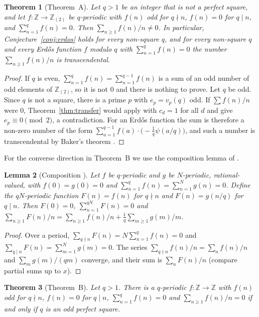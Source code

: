 \documentclass[11pt]{amsart}
\newtheorem{theorem}{Theorem}[section]
\newtheorem{lemma}[theorem]{Lemma}
\theoremstyle{definition}
\theoremstyle{remark}
\providecommand{\Z}{\mathbb Z}
\newcommand{\Zt}{\mathbb Z_{(2)}}
\numberwithin{equation}{section}
\begin{document}
\begin{theorem}[Theorem~A]\label{thm:main}
Let $q>1$ be an integer that is not a perfect square, and let $f\colon\Z\to\Zt$ be $q$-periodic with $f(n)$ odd for $q\nmid n$, $f(n)=0$ for $q\mid n$, and $\sum_{n=1}^qf(n)=0$.
Then $\sum_{n\ge1}f(n)/n\neq0$.
In particular, Conjecture~\ref{conj:erdos} holds for every non-square $q$, and for every non-square $q$ and every Erd\H{o}s function $f$ modulo $q$ with $\sum_{n=1}^qf(n)=0$ the number $\sum_{n\ge1}f(n)/n$ is transcendental.
\end{theorem}

\begin{proof}
If $q$ is even, $\sum_{n=1}^{q}f(n)=\sum_{n=1}^{q-1}f(n)$ is a sum of an odd number of odd elements of $\Zt$, so it is not $0$ and there is nothing to prove.
Let $q$ be odd.
Since $q$ is not a square, there is a prime $p$ with $e_p=v_p(q)$ odd.
If $\sum f(n)/n$ were $0$, Theorem~\ref{thm:transfer} would apply with $c_d=1$ for all $d$ and give $e_p\equiv0\pmod 2$, a contradiction.
For an Erd\H{o}s function the sum is therefore a non-zero number of the form $\sum_{a=1}^{q-1}f(a)\cdot\bigl(-\tfrac1q\psi(a/q)\bigr)$, and such a number is transcendental by Baker's theorem \cite{BBW73,MS07}.
\end{proof}

For the converse direction in Theorem~B we use the composition lemma of \cite{Kei26}.

\begin{lemma}[Composition {\cite[Lemma~3.5]{Kei26}}]\label{lem:compose}
Let $f$ be $q$-periodic and $g$ be $N$-periodic, rational-valued, with $f(0)=g(0)=0$ and $\sum_{n=1}^qf(n)=\sum_{n=1}^Ng(n)=0$.
Define the $qN$-periodic function $F(n)=f(n)$ for $q\nmid n$ and $F(n)=g(n/q)$ for $q\mid n$.
Then $F(0)=0$, $\sum_{n=1}^{qN}F(n)=0$ and $\sum_{n\ge1}F(n)/n=\sum_{n\ge1}f(n)/n+\frac1q\sum_{m\ge1}g(m)/m$.
\end{lemma}

\begin{proof}
Over a period, $\sum_{q\nmid n}F(n)=N\sum_{n=1}^qf(n)=0$ and $\sum_{q\mid n}F(n)=\sum_{m=1}^Ng(m)=0$.
The series $\sum_{q\nmid n}f(n)/n=\sum_nf(n)/n$ and $\sum_mg(m)/(qm)$ converge, and their sum is $\sum_nF(n)/n$ (compare partial sums up to $x$).
\end{proof}

\begin{theorem}[Theorem~B]\label{thm:odd-classification}
Let $q>1$.
There is a $q$-periodic $f\colon\Z\to\Z$ with $f(n)$ odd for $q\nmid n$, $f(n)=0$ for $q\mid n$, $\sum_{n=1}^{q}f(n)=0$ and $\sum_{n\ge1}f(n)/n=0$ if and only if $q$ is an odd perfect square.
\end{theorem}
\end{document}
